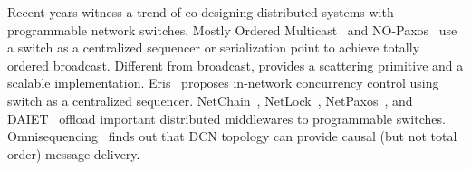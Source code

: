 Recent years witness a trend of co-designing distributed systems with programmable network switches.
Mostly Ordered Multicast~\cite{ports2015designing} and NO-Paxos~\cite{li2016just} use a switch as a centralized sequencer or serialization point to achieve totally ordered broadcast.
Different from broadcast, \sys{} provides a scattering primitive and a scalable implementation.
Eris~\cite{eris} proposes in-network concurrency control using switch as a centralized sequencer.
NetChain~\cite{jin2018netchain}, NetLock~\cite{yu2020netlock}, NetPaxos~\cite{dang2015netpaxos}, and DAIET~\cite{sapio2017network} offload important distributed middlewares to programmable switches.
Omnisequencing~\cite{michael2018towards} finds out that DCN topology can provide causal (but not total order) message delivery.









